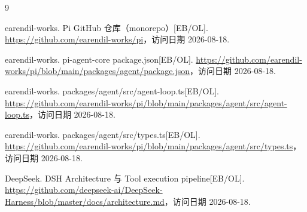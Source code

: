 \begin{thebibliography}{9}

earendil-works. Pi GitHub 仓库（monorepo）[EB/OL].
\url{https://github.com/earendil-works/pi}，访问日期 2026-08-18.

earendil-works. pi-agent-core package.json[EB/OL].
\url{https://github.com/earendil-works/pi/blob/main/packages/agent/package.json}，访问日期 2026-08-18.

earendil-works. packages/agent/src/agent-loop.ts[EB/OL].
\url{https://github.com/earendil-works/pi/blob/main/packages/agent/src/agent-loop.ts}，访问日期 2026-08-18.

earendil-works. packages/agent/src/types.ts[EB/OL].
\url{https://github.com/earendil-works/pi/blob/main/packages/agent/src/types.ts}，访问日期 2026-08-18.

DeepSeek. DSH Architecture 与 Tool execution pipeline[EB/OL].
\url{https://github.com/deepseek-ai/DeepSeek-Harness/blob/master/docs/architecture.md}，访问日期 2026-08-18.

\end{thebibliography}
